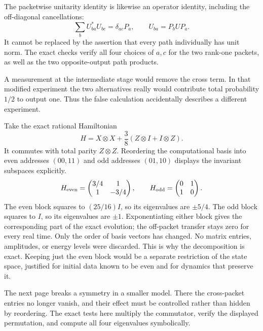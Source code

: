 The packetwise unitarity identity is likewise an operator identity, including the off-diagonal cancellations:
\[
\sum_b U_{ba}^*U_{bc}=\delta_{ac}P_a,
\qquad U_{ba}=P_bUP_a.
\]
It cannot be replaced by the assertion that every path individually has unit norm. The exact checks verify all four choices of $a,c$ for the two rank-one packets, as well as the two opposite-output path products.

A measurement at the intermediate stage would remove the cross term. In that modified experiment the two alternatives really would contribute total probability $1/2$ to output one. Thus the false calculation accidentally describes a different experiment.

Take the exact rational Hamiltonian
\[
H=X\otimes X+\frac38(Z\otimes I+I\otimes Z).
\]
It commutes with total parity $Z\otimes Z$. Reordering the computational basis into even addresses $(00,11)$ and odd addresses $(01,10)$ displays the invariant subspaces explicitly.
\[
H_{\rm even}=\begin{pmatrix}3/4&1\\1&-3/4\end{pmatrix},\qquad
H_{\rm odd}=\begin{pmatrix}0&1\\1&0\end{pmatrix}.
\]
The even block squares to $(25/16)I$, so its eigenvalues are $\pm5/4$. The odd block squares to $I$, so its eigenvalues are $\pm1$. Exponentiating either block gives the corresponding part of the exact evolution; the off-packet transfer stays zero for every real time.
Only the order of basis vectors has changed. No matrix entries, amplitudes, or energy levels were discarded. This is why the decomposition is exact. Keeping just the even block would be a separate restriction of the state space, justified for initial data known to be even and for dynamics that preserve it.

The next page breaks a symmetry in a smaller model. There the cross-packet entries no longer vanish, and their effect must be controlled rather than hidden by reordering. The exact tests here multiply the commutator, verify the displayed permutation, and compute all four eigenvalues symbolically.

